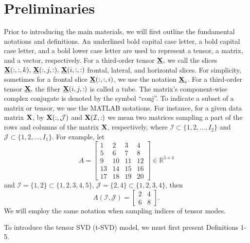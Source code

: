 \documentclass[preprint,12pt]{elsarticle}
\theoremstyle{definition}
\newcommand{\cX}{\underline{\bf X}}
\newcommand{\X}{{\bf X}}
\begin{document}
\section{Preliminaries}\label{Sec:prelim}
Prior to introducing the main materials, we will first outline the fundamental notations and definitions. An underlined bold capital case letter, a bold capital case letter, and a bold lower case letter are used to represent a tensor, a matrix, and a vector, respectively.  For a third-order tensor $\underline{\X},$ we call the slices $\underline{\X}(:,:,k),\,\underline{\X}(:,j,:),\,\underline{\X}(i,:,:)$ frontal, lateral, and horizontal slices. For simplicity, sometimes for a frontal slice $\cX(:,:,i)$, we use the notation $\cX_i$. 
For a third-order tensor $\cX,$ 
the fiber $\underline{\X}(i,j,:)$ is called a tube. {The matrix's component-wise complex conjugate is denoted by the symbol ``conj''.} To indicate a subset of a matrix or tensor, we use the MATLAB notations. For instance, for a given data matrix $\X$, by $\X(:,\mathcal{J})$ and $\X(\mathcal{I},:)$ we mean two matrices sampling a part of the rows and columns of the matrix $\X$, respectively, where $\mathcal{I}\subset\{1,2,\ldots,I_2\}$ and $\mathcal{J}\subset\{1,2,\ldots,I_1\}$. {For example, let
\[A=\begin{bmatrix}
 1 & 2 & 3 & 4\\
 5 & 6 & 7 & 8\\
 9 & 10 &11 & 12\\
 13 & 14 & 15 & 16\\
 17&18&19&20
\end{bmatrix}\in\mathbb{R}^{5\times 4}
\]
and $\mathcal{I}=\{1,2\}\subset\{1,2,3,4,5\},\, \mathcal{J}=\{2,4\}\subset\{1,2,3,4\}$, then 
\[
A(\mathcal{I},\mathcal{J})=\begin{bmatrix}
 2 & 4\\
 6 & 8
\end{bmatrix}.
\]
We will employ the same notation when sampling indices of tensor modes. }

To introduce the tensor SVD (t-SVD) model, we must first present Definitions 1-5.
\end{document}
